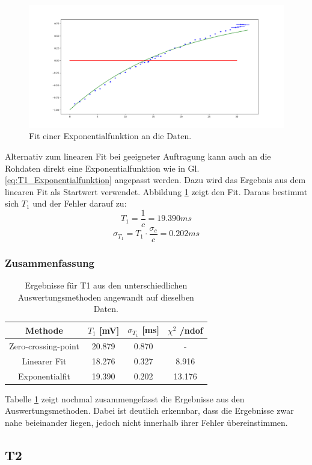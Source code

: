 \documentclass[12pt,a4paper]{article}
\begin{document}
\begin{figure}
\centering
\includegraphics[scale=0.4]{Bilder/T1_expFit.PNG}
\caption{Fit einer Exponentialfunktion an die Daten.}
\label{fig:T1_expFit}
\end{figure}

Alternativ zum linearen Fit bei geeigneter Auftragung kann auch an die Rohdaten direkt eine Exponentialfunktion  wie in Gl. \ref{eq:T1_Exponentialfunktion} angepasst werden. Dazu wird das Ergebnis aus dem linearen Fit als Startwert verwendet. Abbildung \ref{fig:T1_expFit} zeigt den Fit. Daraus bestimmt sich $T_1$ und der Fehler darauf zu:
\begin{equation*}
T_1 = \dfrac{1}{c} = 19.390 ms
\end{equation*}
\begin{equation*}
\sigma _{T_1} = T_1 \cdot \dfrac{\sigma _c}{c} = 0.202 ms
\end{equation*}

\subsubsection{Zusammenfassung}

\begin{table}
\centering
\begin{tabular}{|c|c|c|c|}
\hline 
Methode & $T_1$ [mV] & $\sigma _{T_1}$ [ms] & $\chi ^2$ /ndof \\ 
\hline 
Zero-crossing-point & 20.879 & 0.870 & - \\ 
\hline 
Linearer Fit & 18.276 & 0.327 & 8.916 \\ 
\hline 
Exponentialfit & 19.390 & 0.202 & 13.176 \\ 
\hline 
\end{tabular} 
\caption{Ergebnisse für T1 aus den unterschiedlichen Auswertungsmethoden angewandt auf dieselben Daten.}
\label{tab:T1_Ergebnisse}
\end{table}

Tabelle \ref{tab:T1_Ergebnisse} zeigt nochmal zusammengefasst die Ergebnisse aus den Auswertungsmethoden. Dabei ist deutlich erkennbar, dass die Ergebnisse zwar nahe beieinander liegen, jedoch nicht innerhalb ihrer Fehler übereinstimmen.



\subsection{T2}
\end{document}
